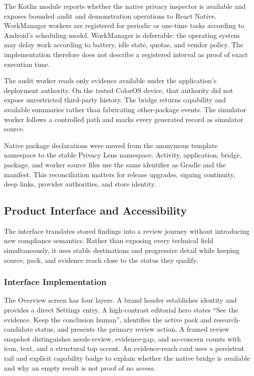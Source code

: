 The Kotlin module reports whether the native privacy inspector is available and exposes bounded audit and demonstration operations to React Native. WorkManager workers are registered for periodic or one-time tasks according to Android's scheduling model. WorkManager is deferrable: the operating system may delay work according to battery, idle state, quotas, and vendor policy. The implementation therefore does not describe a registered interval as proof of exact execution time.

The audit worker reads only evidence available under the application's deployment authority. On the tested ColorOS device, that authority did not expose unrestricted third-party history. The bridge returns capability and available summaries rather than fabricating other-package events. The simulator worker follows a controlled path and marks every generated record as simulator source.

Native package declarations were moved from the anonymous template namespace to the stable Privacy Lens namespace. Activity, application, bridge, package, and worker source files use the same identifier as Gradle and the manifest. This reconciliation matters for release upgrades, signing continuity, deep links, provider authorities, and store identity.

\subsection{Product Interface and Accessibility}

The interface translates stored findings into a review journey without introducing new compliance semantics. Rather than exposing every technical field simultaneously, it uses stable destinations and progressive detail while keeping source, pack, and evidence reach close to the status they qualify.

\subsubsection{Interface Implementation}

The Overview screen has four layers. A brand header establishes identity and provides a direct Settings entry. A high-contrast editorial hero states ``See the evidence. Keep the conclusion human'', identifies the active pack and research-candidate status, and presents the primary review action. A framed review snapshot distinguishes needs-review, evidence-gap, and no-concern counts with icon, text, and a structural top accent. An evidence-reach card uses a persistent rail and explicit capability badge to explain whether the native bridge is available and why an empty result is not proof of no access.

